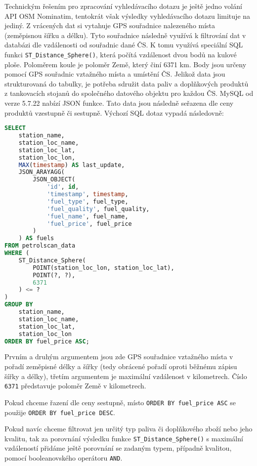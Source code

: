 Technickým řešením pro zpracování vyhledávacího dotazu je ještě jedno volání
API OSM Nominatim, tentokrát však výsledky vyhledávacího dotazu limituje
na jediný. Z vrácených dat si vytahuje GPS souřadnice nalezeného místa
(zeměpisnou šířku a délku). Tyto souřadnice následně využívá k filtrování
dat v databázi dle vzdálenosti od souřadnic dané ČS. K tomu využívá speciální
SQL funkci \texttt{ST\_Distance\_Sphere()}, která počítá vzdálenost dvou bodů
na kulové ploše. Poloměrem koule je poloměr Země, který činí 6371 km.
Body jsou určeny pomocí GPS souřadnic vztažného místa a umístění ČS. Jelikož
data jsou strukturovaná do tabulky, je potřeba sdružit data paliv a doplňkových
produktů z tankovacích stojanů do společného datového objektu pro každou ČS.
MySQL od verze 5.7.22 nabízí JSON funkce. Tato data jsou následně seřazena dle
ceny produktů vzestupně či sestupně. Výchozí SQL dotaz vypadá následovně:

\begin{lstlisting}[label=lst:default-sql-query,caption={SQL dotaz srovnávače cen},language=sql]
SELECT
    station_name,
    station_loc_name,
    station_loc_lat,
    station_loc_lon,
    MAX(timestamp) AS last_update,
    JSON_ARAYAGG(
        JSON_OBJECT(
            'id', id,
            'timestamp', timestamp,
            'fuel_type', fuel_type,
            'fuel_quality', fuel_quality,
            'fuel_name', fuel_name,
            'fuel_price', fuel_price
        )
    ) AS fuels
FROM petrolscan_data
WHERE (
    ST_Distance_Sphere(
        POINT(station_loc_lon, station_loc_lat),
        POINT(?, ?),
        6371
    ) <= ?
)
GROUP BY
    station_name,
    station_loc_name,
    station_loc_lat,
    station_loc_lon
ORDER BY fuel_price ASC;
\end{lstlisting}

Prvním a druhým argumentem jsou zde GPS souřadnice vztažného místa v pořadí zeměpisné
délky a šířky (tedy obrácené pořadí oproti běžnému zápisu šířky a délky), třetím
argumentem je maximální vzdálenost v kilometrech. Číslo \texttt{6371} představuje
poloměr Země v kilometrech.

Pokud chceme řazení dle ceny sestupně, místo \texttt{ORDER BY fuel\_price ASC}
se použije \texttt{ORDER BY fuel\_price DESC}.

Pokud navíc chceme filtrovat jen určitý typ paliva či doplňkového zboží nebo
jeho kvalitu, tak za porovnání výsledku funkce \texttt{ST\_Distance\_Sphere()}
s maximální vzdáleností přidáme ještě porovnání se zadaným typem, případně
kvalitou, pomocí booleanovského operátoru \texttt{AND}.

